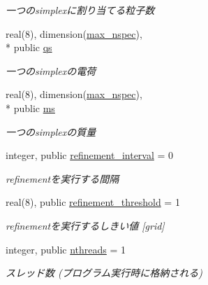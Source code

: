 \begin{DoxyCompactItemize}
\begin{DoxyCompactList}\small\item\em 一つのsimplexに割り当てる粒子数 \end{DoxyCompactList}\item 
\hypertarget{classparameters_a71f6c117b2ba61c174deb48e4a54f179}{real(8), dimension(\hyperlink{classparameters_a402ac2b1acba21a0e9487023da144ca0}{max\-\_\-nspec}), \\*
public \hyperlink{classparameters_a71f6c117b2ba61c174deb48e4a54f179}{qs}}\label{classparameters_a71f6c117b2ba61c174deb48e4a54f179}

\begin{DoxyCompactList}\small\item\em 一つのsimplexの電荷 \end{DoxyCompactList}\item 
\hypertarget{classparameters_a67ef4f76de2b0ae9d021c0e21cd6eae5}{real(8), dimension(\hyperlink{classparameters_a402ac2b1acba21a0e9487023da144ca0}{max\-\_\-nspec}), \\*
public \hyperlink{classparameters_a67ef4f76de2b0ae9d021c0e21cd6eae5}{ms}}\label{classparameters_a67ef4f76de2b0ae9d021c0e21cd6eae5}

\begin{DoxyCompactList}\small\item\em 一つのsimplexの質量 \end{DoxyCompactList}\item 
\hypertarget{classparameters_ada61f5d60d03aebac7ed807f924af868}{integer, public \hyperlink{classparameters_ada61f5d60d03aebac7ed807f924af868}{refinement\-\_\-interval} = 0}\label{classparameters_ada61f5d60d03aebac7ed807f924af868}

\begin{DoxyCompactList}\small\item\em refinementを実行する間隔 \end{DoxyCompactList}\item 
\hypertarget{classparameters_a8302b40667dcbcc4e08fbb0f7d6a79f5}{real(8), public \hyperlink{classparameters_a8302b40667dcbcc4e08fbb0f7d6a79f5}{refinement\-\_\-threshold} = 1}\label{classparameters_a8302b40667dcbcc4e08fbb0f7d6a79f5}

\begin{DoxyCompactList}\small\item\em refinementを実行するしきい値 \mbox{[}grid\mbox{]} \end{DoxyCompactList}\item 
\hypertarget{classparameters_a5e6c8b2ca772fbe6674bbaf3119a95a9}{integer, public \hyperlink{classparameters_a5e6c8b2ca772fbe6674bbaf3119a95a9}{nthreads} = 1}\label{classparameters_a5e6c8b2ca772fbe6674bbaf3119a95a9}

\begin{DoxyCompactList}\small\item\em スレッド数 (プログラム実行時に格納される) \end{DoxyCompactList}\end{DoxyCompactItemize}


